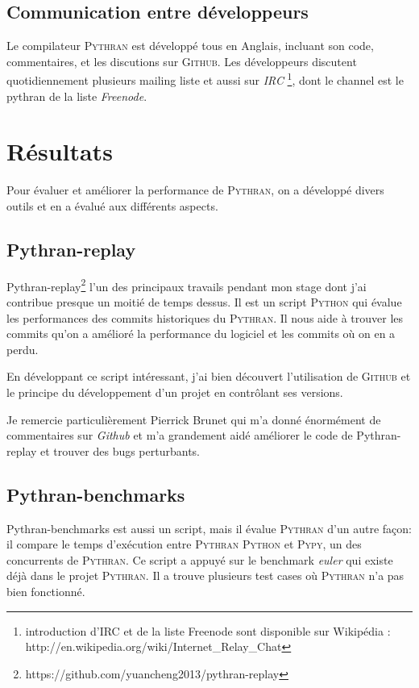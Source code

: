 \documentclass[a4paper, 11pt]{article}
\newcommand\Pythran{\textsc{Pythran}}
\newcommand\Python{\textsc{Python}}
\newcommand\Pypy{\textsc{Pypy}}
\newcommand\Github{\textsc{Github}}
\begin{document}
\subsection*{Communication entre développeurs}

Le compilateur \Pythran{} est développé tous en Anglais, incluant son code,
commentaires, et les discutions sur \Github{}.
Les développeurs discutent quotidiennement plusieurs mailing liste et aussi sur 
\emph{IRC} \footnote{introduction d'IRC et de la liste Freenode sont disponible
sur Wikipédia : http://en.wikipedia.org/wiki/Internet\_Relay\_Chat}, dont le 
channel est le pythran de la liste \emph{Freenode}.

\section{Résultats}
\label{sec:resultats}

Pour évaluer et améliorer la performance de \Pythran{}, on a développé
divers outils et en a évalué aux différents aspects.

\subsection*{Pythran-replay}

Pythran-replay\footnote{https://github.com/yuancheng2013/pythran-replay}
l'un des principaux travails pendant mon stage dont j'ai
contribue presque un moitié de temps dessus. Il est un script
\Python{} qui évalue les performances des commits historiques du \Pythran{}.
Il nous aide à trouver les commits qu'on a amélioré la
performance du logiciel et les commits où on en a perdu.

En développant ce script intéressant, j'ai bien découvert l'utilisation de
\Github{} et le principe du développement d'un projet en contrôlant ses versions.

Je remercie particulièrement Pierrick Brunet qui m'a donné énormément de
commentaires sur \emph{Github} et m'a grandement aidé améliorer le code de Pythran-replay et
trouver des bugs perturbants.

\subsection*{Pythran-benchmarks}

Pythran-benchmarks est aussi un script, mais il évalue \Pythran{} d'un autre
façon: il compare le temps d'exécution entre \Pythran{} \Python{} et \Pypy{},
un des concurrents de \Pythran{}. Ce script a appuyé sur le benchmark
\emph{euler} qui existe déjà dans le projet \Pythran{}. Il a trouve plusieurs
test cases où \Pythran{} n'a pas bien fonctionné.
\end{document}
